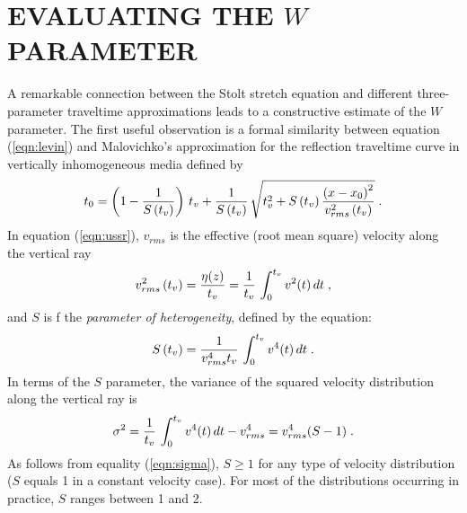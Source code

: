 \section{EVALUATING THE $W$ PARAMETER}

A remarkable connection between the Stolt stretch equation and
different three-parameter traveltime approximations leads to a
constructive estimate of the $W$ parameter.  The first useful
observation is a formal similarity between equation (\ref{eqn:levin})
and Malovichko's approximation for the reflection traveltime curve in
vertically inhomogeneous media \cite[]{ussr,Sword.sep.51.313,castle,nmo}
defined by
\begin{equation}
t_0=
\left(1-{1\over {S\left(t_v\right)}}\right) \,t_v+
{1\over {S\left(t_v\right)}}\,
\sqrt{t_v^2 + {{S\left(t_v\right)}\,
 {{\left(x-x_0\right)^2} \over {v_{rms}^2\left(t_v\right)}}}}\;.
\label{eqn:ussr} 
\end{equation}
In equation (\ref{eqn:ussr}), $v_{rms}$ is the effective (root
mean square) velocity along the vertical ray
\begin{equation}
v_{rms}^2\left(t_v\right)={\eta(z)\over t_v}=
{1 \over t_v}\,\int_{0}^{t_v} v^2(t) \,dt\;,
\label{eqn:vrms} 
\end{equation}
and $S$ is f the {\em parameter of heterogeneity}, defined by the equation:
\begin{equation}
S\left(t_v\right)={1 \over{v_{rms}^4 t_v}}\,\int_{0}^{t_v} v^4(t) \,dt\;.
\label{eqn:heter} 
\end{equation}
In terms of the $S$ parameter, the variance of the squared velocity
distribution along the vertical ray is
\begin{equation}
\sigma^2={1 \over t_v}\,\int_{0}^{t_v} v^4(t) \,dt - v_{rms}^4=v_{rms}^4 (S-1)\;.
\label{eqn:sigma} 
\end{equation}
As follows from equality (\ref{eqn:sigma}), $S\geq 1$ for any type of
velocity distribution ($S$ equals 1 in a constant velocity case). For
most of the distributions occurring in practice, $S$ ranges between 1
and 2.

